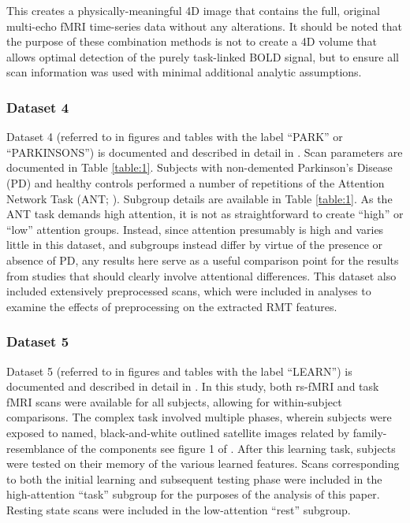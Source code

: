 \documentclass[12pt]{spieman}  %
\begin{document}
\begin{spacing}{2}
This creates a physically-meaningful 4D image that contains the full, original multi-echo fMRI
time-series data without any alterations. It should be noted that the purpose of these combination
methods is not to create a 4D volume that allows optimal detection of the purely task-linked BOLD
signal, but to ensure all scan information was used with minimal additional analytic assumptions.

\subsubsection{Dataset 4}
Dataset 4 (referred to in figures and tables with the label ``PARK'' or ``PARKINSONS'') is documented and
described in detail in \cite{madhyasthaDynamicConnectivityRest2015}. Scan parameters are documented
in Table \ref{table:1}. Subjects with non-demented Parkinson's Disease (PD) and healthy controls performed a
number of repetitions of the Attention Network Task
(ANT; \cite{fanActivationAttentionalNetworks2005} ). Subgroup details are available in Table \ref{table:1}. As the ANT
task demands high attention, it is not as straightforward to create ``high'' or ``low'' attention
groups. Instead, since attention presumably is high and varies little in this dataset, and subgroups
instead differ by virtue of the presence or absence of PD, any results here serve as a useful
comparison point for the results from studies that should clearly involve attentional differences.
This dataset also included extensively preprocessed scans, which were included in analyses to
examine the effects of preprocessing on the extracted RMT features.

\subsubsection{Dataset 5}
Dataset 5 (referred to in figures and tables with the label ``LEARN'') is documented and described in
detail in \cite{schapiroHumanHippocampalReplay2018}. In this study, both rs-fMRI and task fMRI scans
were available for all subjects, allowing for within-subject comparisons. The complex task involved
multiple phases, wherein subjects were exposed to named, black-and-white outlined satellite images
related by family-resemblance of the components see figure 1 of \cite{schapiroHumanHippocampalReplay2018}. After this learning task, subjects were tested on their
memory of the various learned features. Scans corresponding to both the initial learning and
subsequent testing phase were included in the high-attention ``task'' subgroup for the purposes of
the analysis of this paper. Resting state scans were included in the low-attention ``rest''
subgroup.


\end{spacing}
\end{document}
